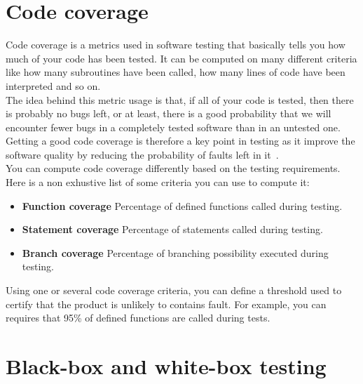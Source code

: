 \documentclass[12pt]{article}
\theoremstyle{definition}
\theoremstyle{definition}
\theoremstyle{remark}
\begin{document}

\section{Code coverage}


Code coverage is a metrics used in software testing that basically tells you how much of your code has been tested. It can be computed on many different criteria like how many subroutines have been called, how many lines of code have been interpreted and so on.\\

The idea behind this metric usage is that, if all of your code is tested, then there is probably no bugs left, or at least, there is a good probability that we will encounter fewer bugs in a completely tested software than in an untested one. Getting a good code coverage is therefore a key point in testing as it improve the software quality by reducing the probability of faults left in it~\cite{TestingForContinuousDelivery:2016}.\\

You can compute code coverage differently based on the testing requirements. Here is a non exhustive list of some criteria you can use to compute it:

\begin{itemize}
\item \textbf{Function coverage} Percentage of defined functions called during testing.
\item \textbf{Statement coverage} Percentage of statements called during testing.
\item \textbf{Branch coverage} Percentage of branching possibility executed during testing.
\end{itemize}

Using one or several code coverage criteria, you can define a threshold used to certify that the product is unlikely to contains fault. For example, you can requires that 95\% of defined functions are called during tests.



\section{Black-box and white-box testing}
\end{document}
